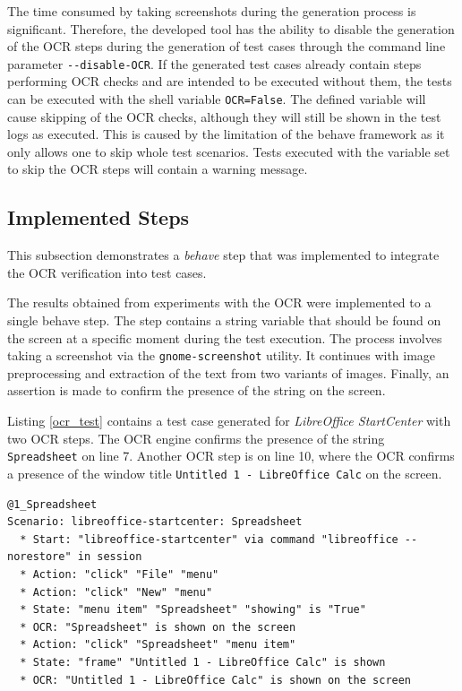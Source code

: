 The time consumed by taking screenshots during the generation process is significant. Therefore, the developed tool has the ability to disable the generation of the OCR steps during the generation of test cases through the command line parameter \texttt{-{}-disable-OCR}. If the generated test cases already contain steps performing OCR checks and are intended to be executed without them, the tests can be executed with the shell variable \texttt{OCR=False}. The defined variable will cause skipping of the OCR checks, although they will still be shown in the test logs as executed. This is caused by the limitation of the behave framework as it only allows one to skip whole test scenarios. Tests executed with the variable set to skip the OCR steps will contain a warning message.


\subsection{Implemented Steps}\label{OCR_steps}
This subsection demonstrates a \textit{behave} step that was implemented to integrate the OCR verification into test cases. 

The results obtained from experiments with the OCR were implemented to a single behave step. The step contains a string variable that should be found on the screen at a specific moment during the test execution. The process involves taking a screenshot via the \texttt{gnome-screenshot} utility. It continues with image preprocessing and extraction of the text from two variants of images. Finally, an assertion is made to confirm the presence of the string on the screen. 

Listing \ref{ocr_test} contains a test case generated for \textit{LibreOffice StartCenter} with two OCR steps. The OCR engine confirms the presence of the string \texttt{Spreadsheet} on line 7. Another OCR step is on line 10, where the OCR confirms a presence of the window title \texttt{Untitled 1 - LibreOffice Calc} on the screen.

\begin{lstlisting}[language=Gherkin,caption={
A test case demonstrating the integration of OCR into test cases},label={ocr_test}]
@1_Spreadsheet
Scenario: libreoffice-startcenter: Spreadsheet
  * Start: "libreoffice-startcenter" via command "libreoffice --norestore" in session
  * Action: "click" "File" "menu"
  * Action: "click" "New" "menu"
  * State: "menu item" "Spreadsheet" "showing" is "True"
  * OCR: "Spreadsheet" is shown on the screen
  * Action: "click" "Spreadsheet" "menu item"
  * State: "frame" "Untitled 1 - LibreOffice Calc" is shown
  * OCR: "Untitled 1 - LibreOffice Calc" is shown on the screen
\end{lstlisting}

